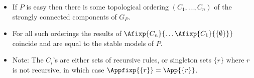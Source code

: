 \begin{frame}
\begin{itemize}
    \bigskip
    \pause
    \item If $P$ is \alert<3>{easy} then there is some \alert<3>{topological ordering}
          $(C_1, \ldots, C_n)$ of the \alert<3>{strongly connected components}
          of $G_P$.
    \pause
    \item For all such orderings the results of
          \alert<4>{$\Afixp{C_n}{\ldots\Afixp{C_1}{\{\emptyset\}}}$}
          coincide and are equal to the \alert<4>{stable models} of $P$.
    \pause
    \bigskip
    \item Note:
          The $C_i$'s are either sets of \alert<5>{recursive rules}, or
          \alert<5>{singleton sets} $\{r\}$ where $r$ is not recursive,
          in which case $\Appfixp{{\{r\}}}=\App{\{r\}}$.
  \end{itemize}

\end{frame}



